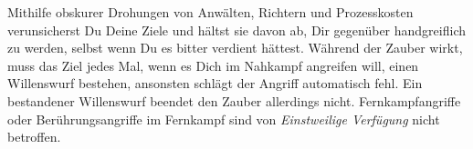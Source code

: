 \documentclass[
	ngerman,
	a4paper,
	11pt,
	twocolumn,
]{scrartcl}
\begin{document}
	\medskip
	
	Mithilfe obskurer Drohungen von Anwälten, Richtern und Prozesskosten verunsicherst Du Deine Ziele und hältst sie davon ab, Dir gegenüber handgreiflich zu werden, selbst wenn Du es bitter verdient hättest. Während der Zauber wirkt, muss das Ziel jedes Mal, wenn es Dich im Nahkampf angreifen will, einen Willenswurf bestehen, ansonsten schlägt der Angriff automatisch fehl. Ein bestandener Willenswurf beendet den Zauber allerdings nicht. Fernkampfangriffe oder Berührungsangriffe im Fernkampf sind von \textit{Einstweilige Verfügung} nicht betroffen.
\end{document}
